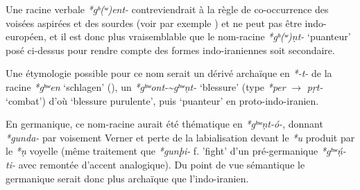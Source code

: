 \documentclass[11pt]{article}
\newcommand{\ipa}[1]{{\phon\textit{#1}}}
\begin{document}
Une racine verbale \ipa{*gʰ(ʷ)ent-} contreviendrait à la règle de co-occurrence des voisées aspirées et des sourdes (voir par exemple \citealt{kuemmel12pie}) et ne peut pas être indo-européen, et il est donc plus vraisemblable que le nom-racine \ipa{*gʰ(ʷ)ṇt-} `puanteur' posé ci-dessus pour rendre compte des formes indo-iraniennes soit secondaire.

Une étymologie possible pour ce nom serait un dérivé  archaïque en \ipa{*-t-} de la racine \ipa{*gʰʷen} `schlagen' (\citealt[218]{liv}), un \ipa{*gʰʷont-\textasciitilde *gʰʷṇt-} `blessure' (type \ipa{*per} $\rightarrow$ \ipa{pṛt-} `combat') d'où `blessure purulente', puis `puanteur' en proto-indo-iranien.

En germanique, ce nom-racine aurait été thématique en \ipa{*gʰʷṇt-ó-}, donnant \ipa{*gunda-} par voisement Verner et perte de la labialisation devant le \ipa{*u} produit par le \ipa{*ṇ} voyelle (même traitement que \ipa{*gunþi-} f. 'fight' d'un pré-germanique \ipa{*gʰʷṇ́-ti-} avec remontée d'accent analogique). Du point de vue sémantique le germanique serait donc plus archaïque que l'indo-iranien.




 
\end{document}

